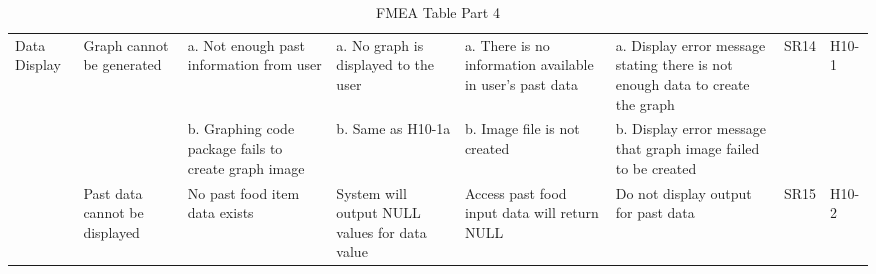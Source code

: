 \documentclass{article}
\begin{document}
\begin{landscape}
\begin{table}[ht]
{\begin{tabular}{|p{2cm}|p{3cm}|p{3cm}|p{3cm}|p{3cm}|p{3cm}|p{1cm}|p{1cm}|}
				Data Display & Graph cannot be generated  & a. Not enough past 
				information from user  & a. No graph is displayed to the user & 
				a. There is no information available in user's past data & a. Display 
				error message stating there is not enough data to create the 
				graph & SR14 & H10-1 \\
				& & b. Graphing code package fails to create graph image & b. Same as H10-1a & b. Image file is not created & b. Display error message that graph image failed to be created & &\\\cline{2-8}
				& Past data cannot be displayed & No past food item data exists & System will output NULL values for data value & Access past food input data will return NULL & Do not display output for past data & SR15 & H10-2\\ \hline
				
			\end{tabular}
		}
		
		\caption{FMEA Table Part 4}
		\label{FMEAPart4}
	\end{table}
\end{landscape}
\end{document}

